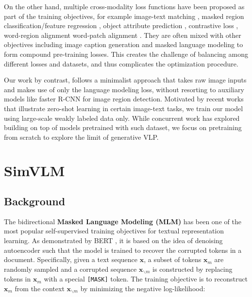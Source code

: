 On the other hand, multiple cross-modality loss functions have been proposed as part of the training objectives, for example image-text matching \citep{tan-bansal-2019-lxmert,jiasen2019vilbert,xu-etal-2021-e2e}, masked region classification/feature regression \citep{tan-bansal-2019-lxmert,chen2020uniter}, object attribute prediction \citep{xu-etal-2021-e2e}, contrastive loss \citep{li2020oscar,li-etal-2021-unimo}, word-region alignment \citep{chen2020uniter} word-patch alignment \citep{kim2021vilt}. They are often mixed with other objectives including image caption generation and masked language modeling to form compound pre-training losses. This creates the challenge of balancing among different losses and datasets, and thus complicates the optimization procedure.

Our work by contrast, follows a minimalist approach that takes raw image inputs and makes use of only the language modeling loss, without resorting to auxiliary models like faster R-CNN for image region detection. Motivated by recent works \citep{radford2021learning,ramesh2021zero,jia2021scaling,tsimpoukelli2021multimodal} that illustrate zero-shot learning in certain image-text tasks, we train our model using large-scale weakly labeled data only. While concurrent work \citep{shen2021much} has explored building on top of models pretrained with such dataset, we focus on pretraining from scratch to explore the limit of generative VLP.

\section{SimVLM} 
\label{sec:approach}

\subsection{Background}

The bidirectional \textbf{Masked Language Modeling (MLM)} has been one of the most popular self-supervised training objectives for textual representation learning. As demonstrated by BERT \citep{devlin2018bert}, it is based on the idea of denoising autoencoder such that the model is trained to recover the corrupted tokens in a document. Specifically, given a text sequence $\textbf{x}$, a subset of tokens $\textbf{x}_m$ are randomly sampled and a corrupted sequence $\textbf{x}_{\backslash m}$ is constructed by replacing tokens in $\textbf{x}_m$ with a special \verb+[MASK]+ token. The training objective is to reconstruct $\textbf{x}_m$ from the context $\textbf{x}_{\backslash m}$ by minimizing the negative log-likelihood:

